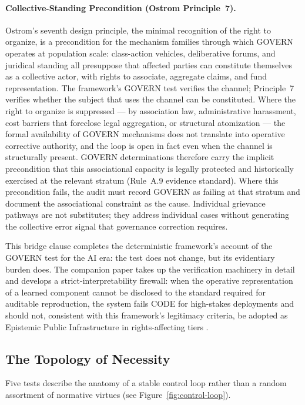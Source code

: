 \documentclass{article}
\begin{document}
\paragraph{Collective-Standing Precondition (Ostrom Principle~7).} Ostrom's seventh design principle, the minimal recognition of the right to organize, is a precondition for the mechanism families through which GOVERN operates at population scale: class-action vehicles, deliberative forums, and juridical standing all presuppose that affected parties can constitute themselves as a collective actor, with rights to associate, aggregate claims, and fund representation. The framework's GOVERN test verifies the channel; Principle~7 verifies whether the subject that uses the channel can be constituted. Where the right to organize is suppressed --- by association law, administrative harassment, cost barriers that foreclose legal aggregation, or structural atomization --- the formal availability of GOVERN mechanisms does not translate into operative corrective authority, and the loop is open in fact even when the channel is structurally present. GOVERN determinations therefore carry the implicit precondition that this associational capacity is legally protected and historically exercised at the relevant stratum (Rule~A.9 evidence standard). Where this precondition fails, the audit must record GOVERN as failing at that stratum and document the associational constraint as the cause. Individual grievance pathways are not substitutes; they address individual cases without generating the collective error signal that governance correction requires.

This bridge clause completes the deterministic framework's account of the GOVERN test for the AI era: the test does not change, but its evidentiary burden does. The companion paper takes up the verification machinery in detail and develops a strict-interpretability firewall: when the operative representation of a learned component cannot be disclosed to the standard required for auditable reproduction, the system fails CODE for high-stakes deployments and should not, consistent with this framework's legitimacy criteria, be adopted as Epistemic Public Infrastructure in rights-affecting tiers \citep{aravind2026epi}.

\subsection{The Topology of Necessity}

Five tests describe the anatomy of a stable control loop rather than a random assortment of normative virtues (see Figure~\ref{fig:control-loop}).
\end{document}
